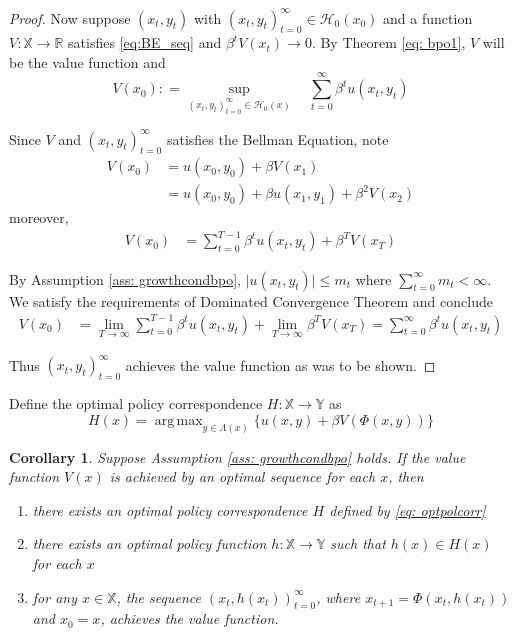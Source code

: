 \documentclass[12pt]{ectaart}
\DeclareMathOperator*{\argmax}{\arg\,max}
\newcommand{\1}{\mathbbm 1}
\theoremstyle{plain}
\newtheorem{corollary}{Corollary}[section]
\theoremstyle{definition}
\begin{document}
\begin{proof}
	Now suppose $(x_{t},y_{t})$ with $(x_{t},y_{t})_{t=0}^{\infty}\in \mathcal{H}_{0}(x_{0})$ and a function $V\colon \mathbb{X}\rightarrow \mathbb{R}$ satisfies \eqref{eq:BE_seq} and $\beta^{t}V(x_{t})\rightarrow 0$. By Theorem \eqref{eq: bpo1}, $V$ will be the value function and
	\begin{equation*}
	V(x_{0}) \colon = \sup_{(x_{t},y_{t})_{t=0}^{\infty}\in \mathcal{H}_{0}(x)}\quad\sum_{t=0}^{\infty}\beta^{t}u(x_{t},y_{t})
	\end{equation*}
	
	Since $V$ and $(x_{t},y_{t})_{t=0}^{\infty}$ satisfies the Bellman Equation, note
	\begin{align*}
	V(x_{0})&  = u(x_{0},y_{0}) + \beta V(x_{1})\\
	& = u(x_{0},y_{0}) + \beta u(x_{1}, y_{1}) + \beta^{2}V(x_{2})
	\end{align*}
	moreover, 
	\begin{align*}
	V(x_{0})&  = \sum_{t=0}^{T-1}\beta^{t}u(x_{t},y_{t}) + \beta^{T} V(x_{T})
	\end{align*}
	
	By Assumption \ref{ass: growthcondbpo}, $\vert u(x_{t},y_{t})\vert \leq m_{t}$ where $\sum_{t=0}^{\infty}m_{t} <\infty$. We satisfy the requirements of Dominated Convergence Theorem and conclude
	\begin{align*}
	V(x_{0})&  = \lim\limits_{T\rightarrow \infty }\sum_{t=0}^{T-1}\beta^{t}u(x_{t},y_{t}) +  \lim\limits_{T\rightarrow \infty }\beta^{T} V(x_{T}) =\sum_{t=0}^{\infty}\beta^{t}u(x_{t},y_{t})
	\end{align*}
	
	Thus $(x_{t},y_{t})_{t=0}^{\infty}$ achieves the value function as was to be shown. 
	\end{proof}

	
	Define the optimal policy correspondence $H\colon \mathbb{X}\rightarrow \mathbb{Y}$ as
	\begin{equation}\label{eq: optpolcorr}
	H(x) = \argmax_{y\in \Lambda(x)}\big\{ u(x,y) + \beta V(\Phi(x,y))\big\}
	\end{equation}

\begin{corollary}\label{corr: polext}
	Suppose Assumption \ref{ass: growthcondbpo} holds.  If the value function $V(x)$ is achieved by an optimal sequence for each $x$, then 
	\begin{enumerate}
		\item there exists an optimal policy correspondence $H$ defined by \eqref{eq: optpolcorr}
		\item there exists an optimal policy function $h\colon \mathbb{X}\rightarrow \mathbb{Y}$ such that $h(x)\in H(x)$ for each $x$ 
		\item for any $x\in \mathbb{X}$, the sequence $(x_{t}, h(x_{t}))_{t=0}^{\infty}$, where $x_{t+1} = \Phi(x_{t},h(x_{t}))$ and $x_{0}=x$, achieves the value function.
	\end{enumerate}
\end{corollary}
\end{document}
